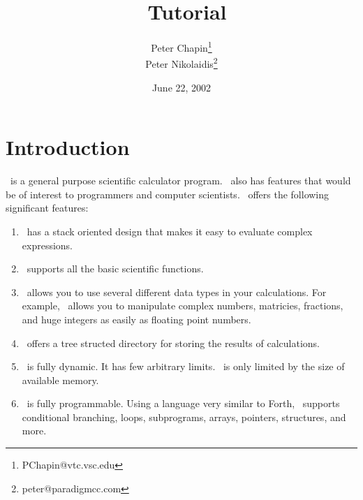 \documentclass{report}
\begin{document}
\title{\CLAC\ Tutorial}
\author{Peter Chapin\thanks{PChapin@vtc.vsc.edu}\\
        Peter Nikolaidis\thanks{peter@paradigmcc.com}}
\date{June 22, 2002}
\maketitle

\tableofcontents
\newpage
{}

\chapter{Introduction}

\CLAC\ is a general purpose scientific calculator program. \CLAC\ also has features that would
be of interest to programmers and computer scientists. \CLAC\ offers the following significant
features:

\begin{enumerate}
  
\item \CLAC\ has a stack oriented design that makes it easy to evaluate complex expressions.
  
\item \CLAC\ supports all the basic scientific functions.
  
\item \CLAC\ allows you to use several different data types in your calculations. For example,
  \CLAC\ allows you to manipulate complex numbers, matricies, fractions, and huge integers as
  easily as floating point numbers.
  
\item \CLAC\ offers a tree structed directory for storing the results of calculations.
  
\item \CLAC\ is fully dynamic. It has few arbitrary limits. \CLAC\ is only limited by the size
  of available memory.
  
\item \CLAC\ is fully programmable. Using a language very similar to Forth, \CLAC\ supports
  conditional branching, loops, subprograms, arrays, pointers, structures, and more.

\end{enumerate}
\end{document}
